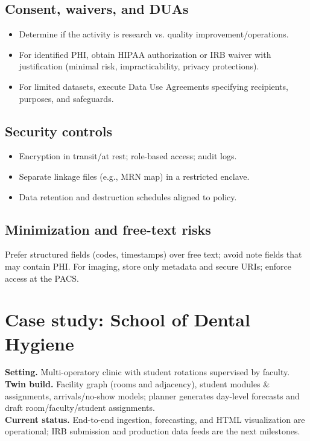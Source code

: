 \documentclass[Afour,sageh,times]{sagej}
\begin{document}
\subsection{Consent, waivers, and DUAs}
\begin{itemize}[leftmargin=*,itemsep=2pt]
  \item Determine if the activity is research vs. quality improvement/operations.
  \item For identified PHI, obtain HIPAA authorization or IRB waiver with justification (minimal risk, impracticability, privacy protections).
  \item For limited datasets, execute Data Use Agreements specifying recipients, purposes, and safeguards.
\end{itemize}

\subsection{Security controls}
\begin{itemize}[leftmargin=*,itemsep=2pt]
  \item Encryption in transit/at rest; role-based access; audit logs.
  \item Separate linkage files (e.g., MRN map) in a restricted enclave.
  \item Data retention and destruction schedules aligned to policy.
\end{itemize}

\subsection{Minimization and free-text risks}
Prefer structured fields (codes, timestamps) over free text; avoid note fields that may contain PHI. For imaging, store only metadata and secure URIs; enforce access at the PACS.

\section{Case study: School of Dental Hygiene}
\textbf{Setting.} Multi-operatory clinic with student rotations supervised by faculty. \\
\textbf{Twin build.} Facility graph (rooms and adjacency), student modules \& assignments, arrivals/no-show models; planner generates day-level forecasts and draft room/faculty/student assignments. \\
\textbf{Current status.} End-to-end ingestion, forecasting, and HTML visualization are operational; IRB submission and production data feeds are the next milestones.
\end{document}
